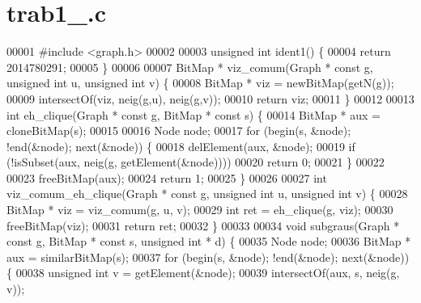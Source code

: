 \section{trab1\+\_.\+c}
\label{trab1__2014780291_8c_source}

\begin{DoxyCode}
00001 \textcolor{preprocessor}{#include <graph.h>}
00002 
00003 \textcolor{keywordtype}{unsigned} \textcolor{keywordtype}{int} ident1() \{
00004         \textcolor{keywordflow}{return} 2014780291;
00005 \}
00006 
00007 BitMap * viz_comum(Graph * \textcolor{keyword}{const} g, \textcolor{keywordtype}{unsigned} \textcolor{keywordtype}{int} u, \textcolor{keywordtype}{unsigned} \textcolor{keywordtype}{int} v) \{
00008         BitMap * viz = newBitMap(getN(g));
00009         intersectOf(viz, neig(g,u), neig(g,v));
00010         \textcolor{keywordflow}{return} viz;
00011 \}
00012 
00013 \textcolor{keywordtype}{int} eh_clique(Graph * \textcolor{keyword}{const} g, BitMap * \textcolor{keyword}{const} s) \{
00014         BitMap * aux = cloneBitMap(s);
00015 
00016         Node node;
00017         \textcolor{keywordflow}{for} (begin(s, &node); !end(&node); next(&node)) \{
00018                 delElement(aux, &node);
00019                 \textcolor{keywordflow}{if} (!isSubset(aux, neig(g, getElement(&node))))
00020                         \textcolor{keywordflow}{return} 0;
00021         \}
00022 
00023         freeBitMap(aux);
00024         \textcolor{keywordflow}{return} 1;
00025 \}
00026 
00027 \textcolor{keywordtype}{int} viz_comum_eh_clique(Graph * \textcolor{keyword}{const} g, \textcolor{keywordtype}{unsigned} \textcolor{keywordtype}{int} u, \textcolor{keywordtype}{unsigned} \textcolor{keywordtype}{int} v) \{
00028         BitMap * viz = viz_comum(g, u, v);
00029         \textcolor{keywordtype}{int} ret = eh_clique(g, viz);
00030         freeBitMap(viz);
00031         \textcolor{keywordflow}{return} ret;
00032 \}
00033 
00034 \textcolor{keywordtype}{void} subgraus(Graph * \textcolor{keyword}{const} g, BitMap * \textcolor{keyword}{const} s, \textcolor{keywordtype}{unsigned} \textcolor{keywordtype}{int} * d) \{
00035         Node node;
00036         BitMap * aux = similarBitMap(s);
00037         \textcolor{keywordflow}{for} (begin(s, &node); !end(&node); next(&node)) \{
00038                 \textcolor{keywordtype}{unsigned} \textcolor{keywordtype}{int} v = getElement(&node);
00039                 intersectOf(aux, s, neig(g, v));

\end{DoxyCode}
